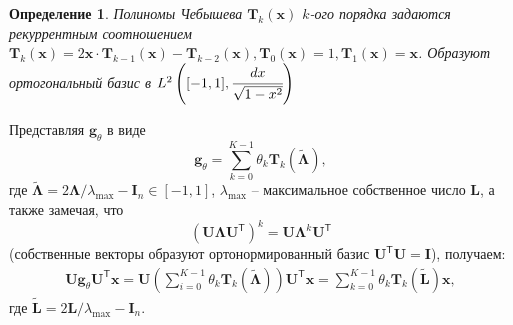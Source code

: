 \documentclass[14pt]{extarticle}
\newtheorem{Def}{Определение}
\begin{document}
\begin{Def}
	\textit{Полиномы Чебышева} $\mathbf{T}_k\mathbf{(x)}$ $k$-ого порядка задаются рекуррентным соотношением  $ \mathbf{T}_{k}(\mathbf{x})=2 \mathbf{x} \cdot \mathbf{T}_{k-1}(\mathbf{x})-\mathbf{T}_{k-2}(\mathbf{x}), \mathbf{T}_{0}(\mathbf{x})=1, \mathbf{T}_{1}(\mathbf{x})=\mathbf{x}$. Образуют ортогональный базис в $L^{2}\left([-1,1], \cfrac{d x} {\sqrt{1-x^{2}}}\right)$
\end{Def}

Представляя $\mathbf{g}_{\theta}$ в виде 
\[\mathbf{g}_{\theta}=\sum_{k=0}^{K-1} \theta_{k} \mathbf{T}_{k}\mathbf{(\tilde{\Lambda})},	\]
где $\mathbf{\tilde{\Lambda}} = 2 \mathbf{\Lambda} / \lambda_{\max }-\mathbf{I}_{n} \in[-1,1]$, $\lambda_{\max }$ -- максимальное собственное число $\mathbf{L}$, а также замечая, что 
\[
\left(\mathbf{U} \mathbf{\Lambda} \mathbf{U}^{\mathsf{T}}\right)^{k}=\mathbf{U} \mathbf{\Lambda}^{k} \mathbf{U}^{\mathsf{T}}
\]
(собственные векторы образуют ортонормированный базис $\mathbf{U}^{\mathsf{T}}\mathbf{U}=\mathbf{I}$), получаем:
\begin{align}
\mathbf{U g}_{\theta} \mathbf{U}^{\mathsf{T}} \mathbf{x}=\mathbf{U}\left(\sum_{i=0}^{K-1} \theta_{k} \mathbf{T}_{k}(\tilde{\mathbf{\Lambda}})\right) \mathbf{U}^{\mathsf{T}} \mathbf{x} = \sum_{k=0}^{K-1} \theta_{k} \mathbf{T}_{k}(\tilde{\mathbf{L}}) \mathbf{x},
\label{cheb_appr}
\end{align}
где $\tilde{\mathbf{L}}=2 \mathbf{L} / \lambda_{\max }-\mathbf{I}_{n}$.
\end{document}
